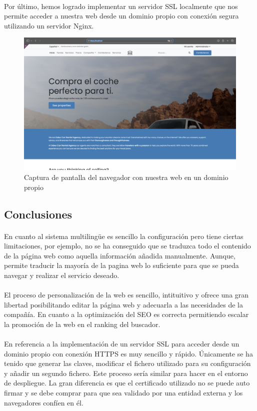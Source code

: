 \paragraph{}
Por último, hemos logrado implementar un servidor SSL localmente que nos permite acceder a nuestra web desde un dominio propio con conexión segura utilizando un servidor Nginx. 
\newpage
\begin{figure}[h]
    \centering
    \includegraphics[width=1\linewidth]{SSL.png}
    \caption{Captura de pantalla del navegador con nuestra web en un dominio propio}
\end{figure}
\subsection{Conclusiones}
\paragraph{}
En cuanto al sistema multilingüe es sencillo la configuración pero tiene ciertas limitaciones, por ejemplo, no se ha conseguido que se traduzca todo el contenido de la página web como aquella información añadida manualmente. Aunque, permite traducir la mayoría de la pagina web lo suficiente para que se pueda navegar y realizar el servicio deseado. 
\paragraph{}
El proceso de personalización de la web es sencillo, intituitivo y ofrece una gran libertad posibilitando editar la página web y adecuarla a las necesidades de la compañía. En cuanto a la optimización del SEO es correcta permitiendo escalar la promoción de la web en el ranking del buscador. 
\paragraph{}
En referencia a la implementación de un servidor SSL para acceder desde un dominio propio con conexión HTTPS es muy sencillo y rápido. Únicamente se ha tenido que generar las claves, modificar el fichero utilizado para su configuración y añadir un segundo fichero. Este proceso sería similar para hacer en el entorno de despliegue. La gran diferencia es que el certificado utilizado no se puede auto firmar y se debe comprar para que sea validado por una entidad externa y los navegadores confíen en él.



